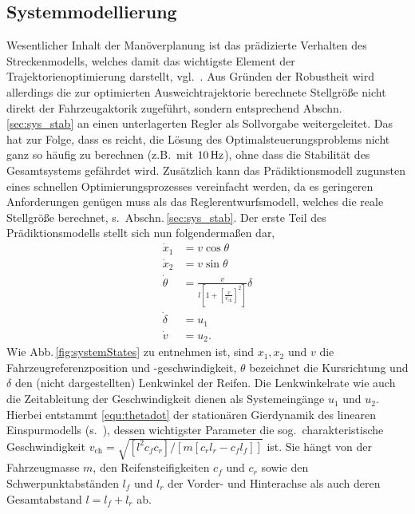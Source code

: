\subsection{Systemmodellierung}\label{sec:modeling}
Wesentlicher Inhalt der Manöverplanung ist das prädizierte Verhalten des Streckenmodells, welches damit das wichtigste Element der Trajektorienoptimierung darstellt, vgl.\ \cite{rawlings2000tutorial}. Aus Gründen der Robustheit wird allerdings die zur optimierten Ausweichtrajektorie berechnete Stellgröße nicht direkt der Fahrzeugaktorik zugeführt, sondern entsprechend Abschn.\,\ref{sec:sys_stab} an einen unterlagerten Regler als Sollvorgabe weitergeleitet. Das hat zur Folge, dass es reicht, die Lösung des Optimalsteuerungsproblems nicht ganz so häufig zu berechnen (z.B.\ mit $\unit[10]{Hz}$), ohne dass die Stabilität des Gesamtsystems gefährdet wird. Zusätzlich kann das Prädiktionsmodell zugunsten eines schnellen Optimierungsprozesses vereinfacht werden, da es geringeren Anforderungen genügen muss als das Reglerentwurfsmodell, welches die reale Stellgröße berechnet, s.\ Abschn.\,\ref{sec:sys_stab}.
%
Der erste Teil des Prädiktionsmodells stellt sich nun folgendermaßen dar, 
\begin{subequations} \label{equ:dgl_mdl_nmpc}
\begin{align}
\label{equ:xdot}
\dot x_1 &= v \cos \theta \\
\dot x_2 &= v \sin \theta \\
\label{equ:thetadot}
\dot \theta &= \frac{v}{l \left[ 1 + \left[\frac{v}{v_{\text{ch}}}\right]^2\right]} \delta \\
\dot \delta &= u_1 \\ %
\label{equ:vdot}
\dot v &= u_2.
\end{align}
\end{subequations}
Wie Abb.\,\ref{fig:systemStates} zu entnehmen ist, sind $x_1, x_2$ und $v$ die Fahrzeugreferenzposition und -ge\-schwin\-dig\-keit, $\theta$ bezeichnet die Kursrichtung und $\delta$ den (nicht dargestellten) Lenkwinkel der Reifen. Die Lenkwinkelrate wie auch die Zeitableitung der Geschwindigkeit dienen als Systemeingänge $u_1$ und $u_2$. Hierbei entstammt \eqref{equ:thetadot} der stationären Gierdynamik 
des linearen Einspurmodells (s.\ \zB \cite{mitschke2004dynamik, Heissing2008, Schramm2010}), dessen wichtigster Parameter die sog.\ charakteristische Geschwindigkeit
 $v_{\text{ch}} = \sqrt{[l^2  c_f c_r]/[m [c_r l_r - c_f l_f]]} $
ist. Sie hängt von der Fahrzeugmasse $m$, den Reifensteifigkeiten $c_f$ und $c_r$ sowie den Schwerpunktabständen $l_f$ und $l_r$ der Vorder- und Hinterachse als auch deren Gesamtabstand $l=l_f + l_r$ ab.

